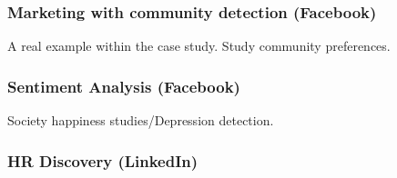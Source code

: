 \subsubsection{Marketing with community detection (Facebook)}
A real example within the case study. Study community preferences.

\subsubsection{Sentiment Analysis (Facebook)}
Society happiness studies/Depression detection.

\subsubsection{HR Discovery (LinkedIn)}
